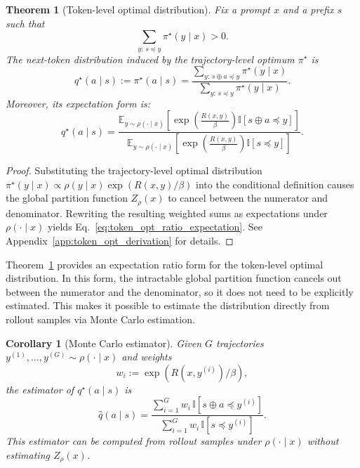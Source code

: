 \documentclass{article}
\newtheorem{theorem}[proposition]{Theorem}
\newtheorem{corollary}[proposition]{Corollary}
\begin{document}
\begin{theorem}[Token-level optimal distribution]
\label{thm:token_level_optimal_distribution}
Fix a prompt $x$ and a prefix $s$ such that
\begin{equation}
\sum_{y:\,s\preceq y}\pi^\star(y\mid x)>0.
\end{equation}
The next-token distribution induced by the trajectory-level optimum $\pi^\star$ is
\begin{equation}
q^\star(a \mid s)
:=
\pi^\star(a \mid s)
=
\frac{\sum_{y:\, s \oplus a \preceq y}\pi^\star(y \mid x)}
{\sum_{y:\, s \preceq y}\pi^\star(y \mid x)}.
\label{eq:token_opt_def}
\end{equation}
Moreover, its expectation form is:
\begin{equation}
q^\star(a \mid s)
=
\frac{
\mathbb{E}_{y \sim \rho(\cdot \mid x)}
\!\left[
\exp\!\left(\frac{R(x,y)}{\beta}\right)\mathbb{I}[s \oplus a \preceq y]
\right]
}{
\mathbb{E}_{y \sim \rho(\cdot \mid x)}
\!\left[
\exp\!\left(\frac{R(x,y)}{\beta}\right)\mathbb{I}[s \preceq y]
\right]
}.
\label{eq:token_opt_ratio_expectation}
\end{equation}
\end{theorem}

\begin{proof}
Substituting the trajectory-level optimal distribution $\pi^\star(y\mid x)\propto\rho(y\mid x)\exp(R(x,y)/\beta)$ into the conditional definition causes the global partition function $Z_\rho(x)$ to cancel between the numerator and denominator. Rewriting the resulting weighted sums as expectations under $\rho(\cdot\mid x)$ yields Eq.~\eqref{eq:token_opt_ratio_expectation}. See Appendix~\ref{app:token_opt_derivation} for details.
\end{proof}

Theorem~\ref{thm:token_level_optimal_distribution} provides an expectation
ratio form for the token-level optimal distribution. In this form, the
intractable global partition function cancels out between the numerator and
the denominator, so it does not need to be explicitly estimated. This makes it
possible to estimate the distribution directly from rollout samples via
Monte Carlo estimation.

\begin{corollary}[Monte Carlo estimator]
\label{cor:partition_free_mc_estimator}
Given $G$ trajectories
$y^{(1)},\dots,y^{(G)} \sim \rho(\cdot \mid x)$ and weights
\begin{equation}
w_i := \exp(R(x,y^{(i)})/\beta),
\end{equation}
the estimator of $q^\star(a\mid s)$ is
\begin{equation}
\widehat q(a \mid s)
=
\frac{
\sum_{i=1}^G w_i\,\mathbb{I}[s \oplus a \preceq y^{(i)}]
}{
\sum_{i=1}^G w_i\,\mathbb{I}[s \preceq y^{(i)}]
}.
\label{eq:token_opt_mc}
\end{equation}
This estimator can be computed from rollout samples under $\rho(\cdot\mid x)$ without estimating $Z_\rho(x)$.
\end{corollary}
\end{document}
